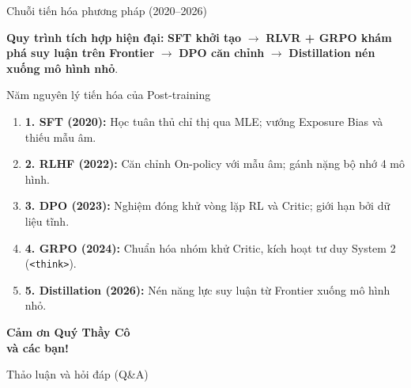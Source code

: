 \begin{frame}{Chuỗi tiến hóa phương pháp (2020--2026)}
\begin{center}
{%
    }
  \end{center}
  \vspace{0.05cm}
  \small
  \textbf{Quy trình tích hợp hiện đại:} \textbf{SFT khởi tạo} $\longrightarrow$ \textbf{RLVR + GRPO khám phá suy luận trên Frontier} $\longrightarrow$ \textbf{DPO căn chỉnh} $\longrightarrow$ \textbf{Distillation nén xuống mô hình nhỏ}.
  \par\vspace{0pt}
\end{frame}

\begin{frame}{Năm nguyên lý tiến hóa của Post-training}
  \small
  \begin{enumerate}\setlength{\itemsep}{3pt}
    \item \textbf{1. SFT (2020):} Học tuân thủ chỉ thị qua MLE; vướng Exposure Bias và thiếu mẫu âm.
    \item \textbf{2. RLHF (2022):} Căn chỉnh On-policy với mẫu âm; gánh nặng bộ nhớ 4 mô hình.
    \item \textbf{3. DPO (2023):} Nghiệm đóng khử vòng lặp RL và Critic; giới hạn bởi dữ liệu tĩnh.
    \item \textbf{4. GRPO (2024):} Chuẩn hóa nhóm khử Critic, kích hoạt tư duy System 2 (\texttt{<think>}).
    \item \textbf{5. Distillation (2026):} Nén năng lực suy luận từ Frontier xuống mô hình nhỏ.
  \end{enumerate}
  \par\vspace{0pt}
\end{frame}

\begin{frame}[plain]
  \begin{center}
    \vspace{1.5cm}
    {\LARGE\bfseries\color{refblue}Cảm ơn Quý Thầy Cô\\và các bạn!\par}
    \vspace{0.6cm}
    {\large\color{reforange}Thảo luận và hỏi đáp (Q\&A)}
  \end{center}
\end{frame}
